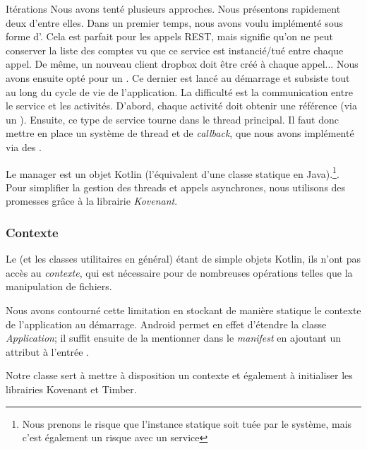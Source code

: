 \begin{notepar}{Itérations}
Nous avons tenté plusieurs approches. Nous présentons rapidement deux d'entre elles.
\newline\newline
Dans un premier temps, nous avons voulu implémenté  sous forme d'. Cela est parfait pour les appels REST, mais signifie qu'on ne peut conserver la liste des comptes vu que ce service est instancié/tué entre chaque appel. De même, un nouveau client dropbox doit être créé à chaque appel...
\newline\newline
Nous avons ensuite opté pour un . Ce dernier est lancé au démarrage et subsiste tout au long du cycle de vie de l'application. La difficulté est la communication entre le service et les activités. 
D'abord, chaque activité doit obtenir une référence (via un ). Ensuite, ce type de service tourne dans le thread principal. Il faut donc mettre en place un système de thread et de \emph{callback}, que nous avons implémenté via des . 
\end{notepar}

Le manager est un objet Kotlin (l'équivalent d'une classe statique en Java).\footnote{Nous prenons le risque que l'instance statique soit tuée par le système, mais c'est également un risque avec un service}. Pour simplifier la gestion des threads et appels asynchrones, nous utilisons des promesses grâce à la librairie \emph{Kovenant}.

\subsubsection*{Contexte}

Le  (et les classes utilitaires en général) étant de simple objets Kotlin, ils n'ont pas accès au \emph{contexte}, qui est nécessaire pour de nombreuses opérations telles que la manipulation de fichiers.

Nous avons contourné cette limitation en stockant de manière statique le contexte de l'application au démarrage. Android permet en effet d'étendre la classe \emph{Application}; il suffit ensuite de la mentionner dans le \emph{manifest} en ajoutant un attribut  à l'entrée . 

Notre classe  sert à mettre à disposition un contexte et également à initialiser les librairies Kovenant et Timber.

